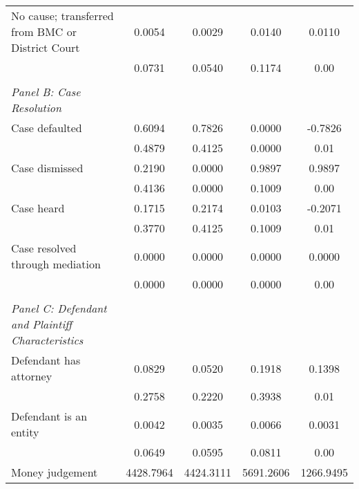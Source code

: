 {\begin{tabular}{l*{4}{c}}
\hspace{0.25cm}No cause; transferred from BMC or District Court&     0.0054 &     0.0029 &     0.0140 &      0.0110\\
                    &     0.0731 &     0.0540 &     0.1174 &        0.00\\
\vspace{0.1em} \\ \emph{Panel B: Case Resolution}&            &            &            &            \\
\hspace{0.25cm}Case defaulted&     0.6094 &     0.7826 &     0.0000 &     -0.7826\\
                    &     0.4879 &     0.4125 &     0.0000 &        0.01\\
\hspace{0.25cm}Case dismissed&     0.2190 &     0.0000 &     0.9897 &      0.9897\\
                    &     0.4136 &     0.0000 &     0.1009 &        0.00\\
\hspace{0.25cm}Case heard&     0.1715 &     0.2174 &     0.0103 &     -0.2071\\
                    &     0.3770 &     0.4125 &     0.1009 &        0.01\\
\hspace{0.25cm}Case resolved through mediation&     0.0000 &     0.0000 &     0.0000 &      0.0000\\
                    &     0.0000 &     0.0000 &     0.0000 &        0.00\\
\vspace{0.1em} \\ \emph{Panel C: Defendant and Plaintiff Characteristics}&            &            &            &            \\
\hspace{0.25cm}Defendant has attorney&     0.0829 &     0.0520 &     0.1918 &      0.1398\\
                    &     0.2758 &     0.2220 &     0.3938 &        0.01\\
\hspace{0.25cm}Defendant is an entity&     0.0042 &     0.0035 &     0.0066 &      0.0031\\
                    &     0.0649 &     0.0595 &     0.0811 &        0.00\\
\hspace{0.25cm}Money judgement&  4428.7964 &  4424.3111 &  5691.2606 &   1266.9495\\

\end{tabular}}
